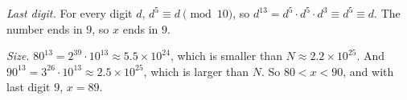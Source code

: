 \emph{Last digit.} For every digit $d$, $d^5\equiv d\pmod{10}$, so $d^{13}=d^5\cdot d^5\cdot d^3\equiv d^5\equiv d$. The number ends in $9$, so $x$ ends in $9$.

\emph{Size.} $80^{13}=2^{39}\cdot10^{13}\approx5.5\times10^{24}$, which is smaller than $N\approx2.2\times10^{25}$. And $90^{13}=3^{26}\cdot10^{13}\approx2.5\times10^{25}$, which is larger than $N$. So $80<x<90$, and with last digit $9$, $x=\boxed{89}$.
